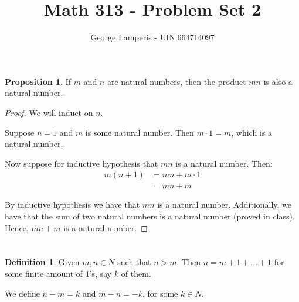 \documentclass[12pt, letterpaper]{article}
\theoremstyle{definition} %
\newtheorem*{prop}{Proposition}
\newtheorem*{definition}{Definition}
\begin{document}
\title{Math 313 - Problem Set 2}%
\author{George Lamperis - UIN:664714097} %
\date{}
\maketitle

\section{}

\begin{prop}
    If $m$ and $n$ are natural numbers, then the product $mn$ is also a natural
    number.

    \begin{proof}
        We will induct on $n$.

        Suppose $n=1$ and $m$ is some natural number. Then $m \cdot 1 = m$, which
        is a natural number. 

        Now suppose for inductive hypothesis that $mn$ is a natural number. Then:
        \begin{align*}
            m(n+1) &= mn + m \cdot 1 \\
                   &= mn + m 
        \end{align*}

        By inductive hypothesis we have that $mn$ is a natural number. Additionally, 
        we have that the sum of two natural numbers is a natural number (proved 
        in class). Hence, $mn + m$ is a natural number.
    \end{proof}
\end{prop}


\section{}

\begin{definition}
    Given $m,n \in N$ such that $n > m$. Then $n = m + 1 + ... + 1$ for some 
    finite amount of 1's, say $k$ of them. 

    We define $n - m = k$ and $m - n = -k$. for some $k \in N$.
\end{definition}
\end{document}
